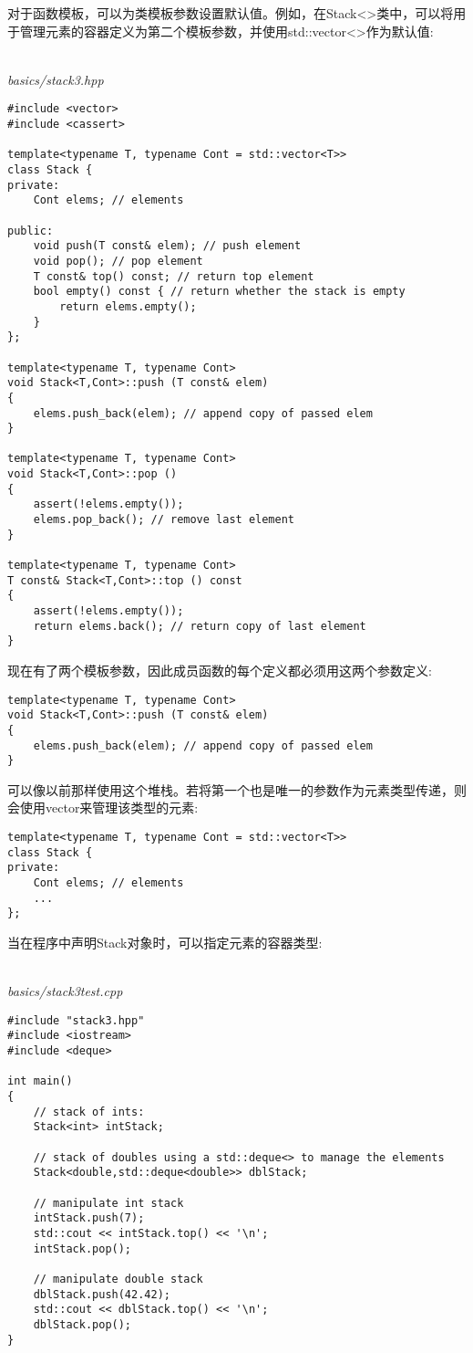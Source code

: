 对于函数模板，可以为类模板参数设置默认值。例如，在Stack<>类中，可以将用于管理元素的容器定义为第二个模板参数，并使用std::vector<>作为默认值:

\hspace*{\fill} \\ %
\noindent
\textit{basics/stack3.hpp}
\begin{lstlisting}[style=styleCXX]
#include <vector>
#include <cassert>

template<typename T, typename Cont = std::vector<T>>
class Stack {
private:
	Cont elems; // elements
	
public:
	void push(T const& elem); // push element
	void pop(); // pop element
	T const& top() const; // return top element
	bool empty() const { // return whether the stack is empty
		return elems.empty();
	}
};

template<typename T, typename Cont>
void Stack<T,Cont>::push (T const& elem)
{
	elems.push_back(elem); // append copy of passed elem
}

template<typename T, typename Cont>
void Stack<T,Cont>::pop ()
{
	assert(!elems.empty());
	elems.pop_back(); // remove last element
}

template<typename T, typename Cont>
T const& Stack<T,Cont>::top () const
{
	assert(!elems.empty());
	return elems.back(); // return copy of last element
}
\end{lstlisting}

现在有了两个模板参数，因此成员函数的每个定义都必须用这两个参数定义:

\begin{lstlisting}[style=styleCXX]
template<typename T, typename Cont>
void Stack<T,Cont>::push (T const& elem)
{
	elems.push_back(elem); // append copy of passed elem
}
\end{lstlisting}

可以像以前那样使用这个堆栈。若将第一个也是唯一的参数作为元素类型传递，则会使用vector来管理该类型的元素:

\begin{lstlisting}[style=styleCXX]
template<typename T, typename Cont = std::vector<T>>
class Stack {
private:
	Cont elems; // elements
	...
};
\end{lstlisting}

当在程序中声明Stack对象时，可以指定元素的容器类型:

\hspace*{\fill} \\ %
\noindent
\textit{basics/stack3test.cpp}
\begin{lstlisting}[style=styleCXX]
#include "stack3.hpp"
#include <iostream>
#include <deque>

int main()
{
	// stack of ints:
	Stack<int> intStack;

	// stack of doubles using a std::deque<> to manage the elements
	Stack<double,std::deque<double>> dblStack;

	// manipulate int stack
	intStack.push(7);
	std::cout << intStack.top() << '\n';
	intStack.pop();

	// manipulate double stack
	dblStack.push(42.42);
	std::cout << dblStack.top() << '\n';
	dblStack.pop();
}
\end{lstlisting}


